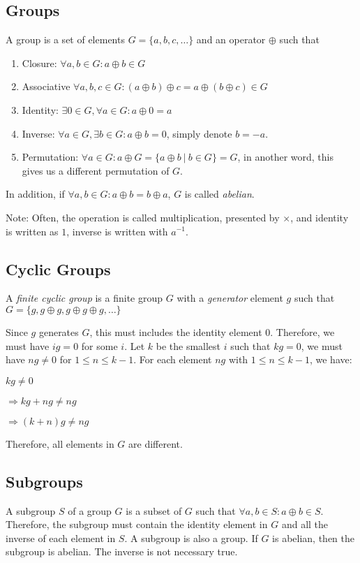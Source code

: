 \documentclass[10pt]{article}
\begin{document}
\subsection{Groups}
A group is a set of elements $G = \{a, b, c, \ldots\}$ and an operator
$\oplus$ such that
\begin{enumerate}
    \item Closure: $\forall a, b \in G: a \oplus b \in G$
    \item Associative $\forall a, b, c \in G: (a \oplus b) \oplus c = a \oplus
        (b \oplus c)\in G$
    \item Identity: $\exists 0 \in G, \forall a \in G: a \oplus 0 = a$
    \item Inverse: $\forall a \in G, \exists b \in G: a \oplus b = 0$, simply
        denote $b = -a$.
    \item Permutation: $\forall a \in G: a \oplus G = \{a \oplus b\ \vert\ b \in G\} =
        G$, in another word, this gives us a different permutation of $G$.
\end{enumerate}
In addition, if $\forall a, b \in G: a \oplus b = b \oplus a$, $G$ is called
\emph{abelian}.

Note: Often, the operation is called multiplication, presented by $\times$, and
identity is written as $1$, inverse is written with $a^{-1}$.

\subsection{Cyclic Groups}
A \emph{finite cyclic group} is a finite group $G$ with a \emph{generator}
element $g$ such that $G = \{g, g \oplus g, g \oplus g \oplus g, \ldots\}$

Since $g$ generates $G$, this must includes the identity element $0$. 
Therefore, we must have $ig = 0$ for some $i$. Let $k$ be the smallest $i$
such that $kg = 0$, we must have $ng \neq 0$ for $1 \leq n \leq k - 1$.
For each element $ng$ with $1 \leq n \leq k - 1$, we have:
\begin{description}
    \item $kg \neq 0$
    \item $\Longrightarrow kg + ng \neq ng$
    \item $\Longrightarrow (k + n)g \neq ng$
\end{description}
Therefore, all elements in $G$ are different.

\subsection{Subgroups}
A subgroup $S$ of a group $G$ is a subset of $G$ such that $\forall a,b \in S:
a \oplus b \in S$. Therefore, the subgroup must contain the identity element in
$G$ and all the inverse of each element in $S$. A subgroup is also a group.
If $G$ is abelian, then the subgroup is abelian. The inverse is not necessary
true.
\end{document}
